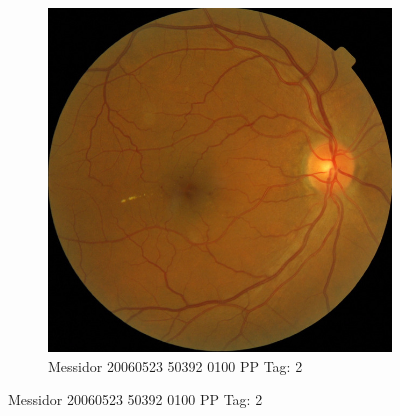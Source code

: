 \begin{figure}[ht!]
\begin{subfigure}[b]{0.4\textwidth}
		\includegraphics[width=\textwidth]{Figures/chapter_stability/20060523_50392_0100_PP/20060523_50392_0100_PP.jpeg}
		\caption{Messidor 20060523 50392 0100 PP Tag: 2}		
	\end{subfigure}
	

\end{figure}
